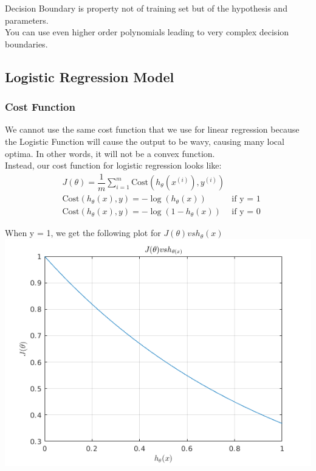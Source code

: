 Decision Boundary is property not of training set but of the hypothesis and parameters. \\

You can use even higher order polynomials leading to very complex decision boundaries.

\subsection{Logistic Regression Model}
\subsubsection{Cost Function}

We cannot use the same cost function that we use for linear regression because the Logistic Function will cause the output to be wavy, causing many local optima. In other words, it will not be a convex function.\\

Instead, our cost function for logistic regression looks like:
\begin{equation}
  \begin{aligned}
    & J(\theta) = \dfrac{1}{m} \sum_{i=1}^m \mathrm{Cost}(h_\theta(x^{(i)}),y^{(i)}) \\
    & \mathrm{Cost}(h_\theta(x),y) = -\log(h_\theta(x)) \; & \text{if y = 1} \\
    & \mathrm{Cost}(h_\theta(x),y) = -\log(1-h_\theta(x)) \; & \text{if y = 0}
  \end{aligned}
\end{equation}

When y = 1, we get the following plot for $J(\theta) vs h_{\theta}(x)$\\
\includegraphics{matlab/logistic_cost_1.png} \\


